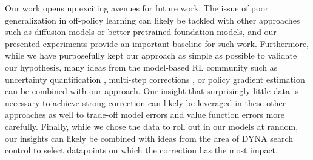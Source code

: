Our work opens up exciting avenues for future work.
The issue of poor generalization in off-policy learning can likely be tackled with other approaches such as diffusion models \parencite{lu2024synthetic} or better pretrained foundation models, and our presented experiments provide an important baseline for such work.
Furthermore, while we have purposefully kept our approach as simple as possible to validate our hypothesis, many ideas from the model-based RL community such as uncertainty quantification \parencite{pets,talvitie2024bounding}, multi-step corrections \parencite{buckman2018sample,hafner2020dream}, or policy gradient estimation \parencite{amos2021model} can be combined with our approach.
Our insight that surprisingly little data is necessary to achieve strong correction can likely be leveraged in these other approaches as well to trade-off model errors and value function errors more carefully.
Finally, while we chose the data to roll out in our models at random, our insights can likely be combined with ideas from the area of DYNA search control \parencite{pan2019hill,pan2020frequency} to select datapoints on which the correction has the most impact.
